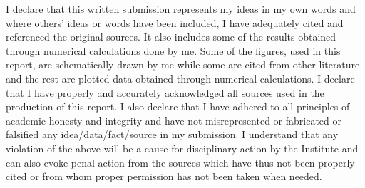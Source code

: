 %
\begin{Declaration}
\noindent

I declare that this written submission represents my ideas in my own words and where others' ideas or words have been included, I have adequately cited and referenced the original sources. It also includes some of the results obtained
through numerical calculations done by me. Some of the figures, used in this
report, are schematically drawn by me while some are cited from other literature and the rest are plotted data obtained through numerical calculations. I declare that I have properly and accurately acknowledged all sources used in the production of this report. I also declare that I have adhered to all principles of academic honesty and integrity and have not misrepresented or fabricated or falsified any idea/data/fact/source in my submission. I understand that any violation of the above will be a cause for disciplinary action by the Institute and can also evoke penal action from the sources which have thus not been properly cited or from whom proper permission has not been taken when needed.

%
%
%
%
%
%
%

\DecSign[\today]



%
\end{Declaration}
















